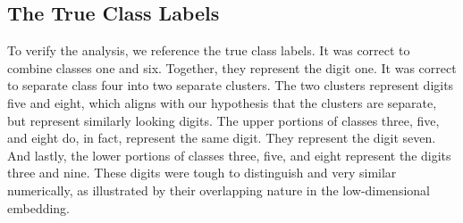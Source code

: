 \documentclass{article}
\begin{document}
\subsection{The True Class Labels}
To verify the analysis, we reference the true class labels. It was correct to combine classes one and six. Together, they represent the digit one. It was correct to separate class four into two separate clusters. The two clusters represent digits five and eight, which aligns with our hypothesis that the clusters are separate, but represent similarly looking digits. The upper portions of classes three, five, and eight do, in fact, represent the same digit. They represent the digit seven. And lastly, the lower portions of classes three, five, and eight represent the digits three and nine. These digits were tough to distinguish and very similar numerically, as illustrated by their overlapping nature in the low-dimensional embedding.

\newpage
\end{document}
